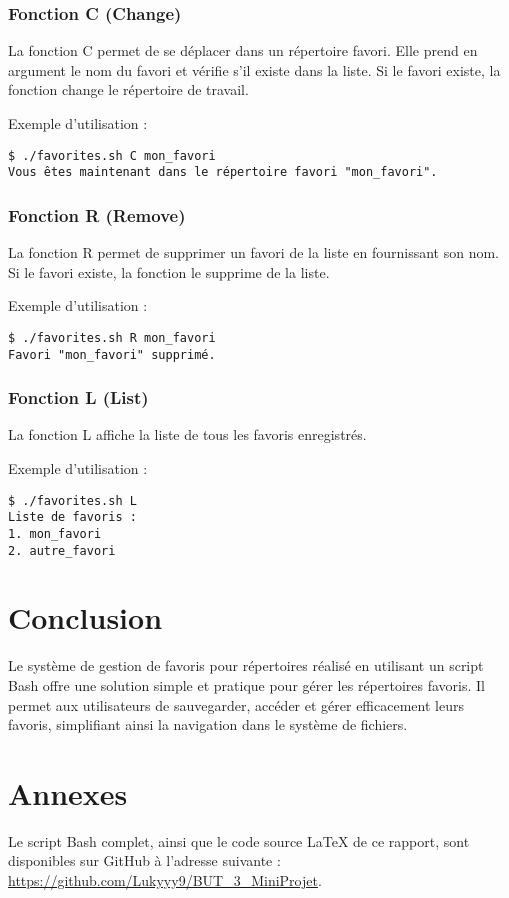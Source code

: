 \documentclass[a4paper, 12pt]{article}
\begin{document}
\subsubsection{Fonction C (Change)}
La fonction C permet de se déplacer dans un répertoire favori. Elle prend en argument le nom du favori et vérifie s'il existe dans la liste. Si le favori existe, la fonction change le répertoire de travail.

Exemple d'utilisation :
\begin{lstlisting}[style=mystyle]
$ ./favorites.sh C mon_favori
Vous êtes maintenant dans le répertoire favori "mon_favori".
\end{lstlisting}

\subsubsection{Fonction R (Remove)}
La fonction R permet de supprimer un favori de la liste en fournissant son nom. Si le favori existe, la fonction le supprime de la liste.

Exemple d'utilisation :
\begin{lstlisting}[style=mystyle]
$ ./favorites.sh R mon_favori
Favori "mon_favori" supprimé.
\end{lstlisting}

\subsubsection{Fonction L (List)}
La fonction L affiche la liste de tous les favoris enregistrés.

Exemple d'utilisation :
\begin{lstlisting}[style=mystyle]
$ ./favorites.sh L
Liste de favoris :
1. mon_favori
2. autre_favori
\end{lstlisting}

\section{Conclusion}
Le système de gestion de favoris pour répertoires réalisé en utilisant un script Bash offre une solution simple et pratique pour gérer les répertoires favoris. Il permet aux utilisateurs de sauvegarder, accéder et gérer efficacement leurs favoris, simplifiant ainsi la navigation dans le système de fichiers.

\section{Annexes}
Le script Bash complet, ainsi que le code source LaTeX de ce rapport, sont disponibles sur GitHub à l'adresse suivante : \url{https://github.com/Lukyyy9/BUT_3_MiniProjet}.
\end{document}
